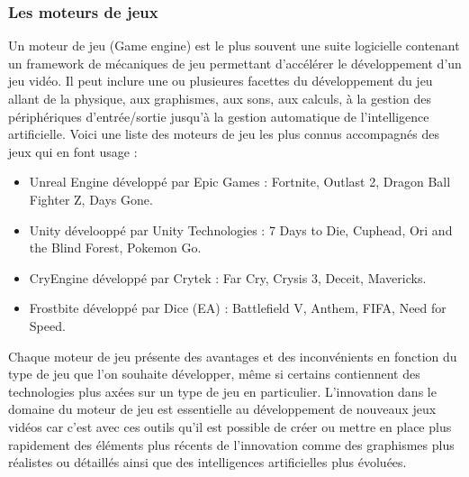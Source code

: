 \subsubsection{Les moteurs de jeux}
Un moteur de jeu (Game engine) est le plus souvent une suite logicielle contenant un framework de mécaniques de jeu permettant d'accélérer le développement d'un jeu vidéo. Il peut inclure une ou plusieures facettes du développement du jeu allant de la physique, aux graphismes, aux sons, aux calculs, à la gestion des périphériques d'entrée/sortie jusqu'à la gestion automatique de l'intelligence artificielle. Voici une liste des moteurs de jeu les plus connus accompagnés des jeux qui en font usage : 
\begin{itemize}
    \item Unreal Engine développé par Epic Games : Fortnite, Outlast 2, Dragon Ball Fighter Z, Days Gone.
    \item Unity dévelooppé par Unity Technologies : 7 Days to Die, Cuphead, Ori and the Blind Forest, Pokemon Go.
    \item CryEngine développé par Crytek : Far Cry, Crysis 3, Deceit, Mavericks.
    \item Frostbite développé par Dice (EA) : Battlefield V, Anthem, FIFA, Need for Speed.
\end{itemize}

Chaque moteur de jeu présente des avantages et des inconvénients en fonction du type de jeu que l'on souhaite développer, même si certains contiennent des technologies plus axées sur un type de jeu en particulier. L'innovation dans le domaine du moteur de jeu est essentielle au développement de nouveaux jeux vidéos car c'est avec ces outils qu'il est possible de créer ou mettre en place plus rapidement des éléments plus récents de l'innovation comme des graphismes plus réalistes ou détaillés ainsi que des intelligences artificielles plus évoluées.

